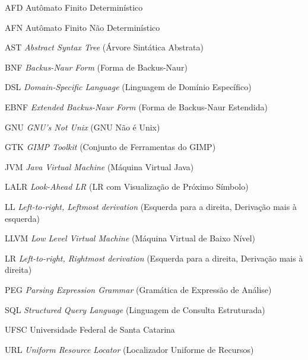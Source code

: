 \documentclass[
    12pt
    ,oneside
    ,a4paper
    ,chapter=TITLE
    ,section=TITLE
    ,sumario=abnt-6027-2012]{abntex2}
\begin{document}
\begin{siglas}
    \item[AFD]   Autômato Finito Determinístico
    \item[AFN]   Autômato Finito Não Determinístico
    \item[AST]   \textit{Abstract Syntax Tree} (Árvore Sintática Abstrata)
    \item[BNF]   \textit{Backus-Naur Form} (Forma de Backus-Naur)
    \item[DSL]   \textit{Domain-Specific Language} (Linguagem de Domínio Específico)
    \item[EBNF]  \textit{Extended Backus-Naur Form} (Forma de Backus-Naur Estendida)
    \item[GNU]   \textit{GNU's Not Unix} (GNU Não é Unix)
    \item[GTK]   \textit{GIMP Toolkit} (Conjunto de Ferramentas do GIMP)
    \item[JVM]   \textit{Java Virtual Machine} (Máquina Virtual Java)
    \item[LALR]  \textit{Look-Ahead LR} (LR com Visualização de Próximo Símbolo)
    \item[LL]    \textit{Left-to-right, Leftmost derivation} (Esquerda para a direita, Derivação mais à esquerda)
    \item[LLVM]  \textit{Low Level Virtual Machine} (Máquina Virtual de Baixo Nível)
    \item[LR]    \textit{Left-to-right, Rightmost derivation} (Esquerda para a direita, Derivação mais à direita)
    \item[PEG]   \textit{Parsing Expression Grammar} (Gramática de Expressão de Análise)
    \item[SQL]   \textit{Structured Query Language} (Linguagem de Consulta Estruturada)
    \item[UFSC]  Universidade Federal de Santa Catarina
    \item[URL]   \textit{Uniform Resource Locator} (Localizador Uniforme de Recursos)
\end{siglas}
\end{document}
